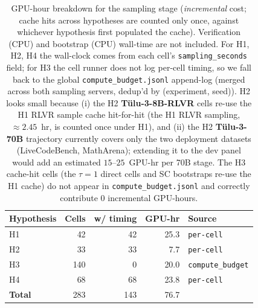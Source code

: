 \begin{table}[htbp]
\centering
\small
\caption{GPU-hour breakdown for the sampling stage (\emph{incremental} cost; cache hits across hypotheses are counted only once, against whichever hypothesis first populated the cache). Verification (CPU) and bootstrap (CPU) wall-time are not included. For H1, H2, H4 the wall-clock comes from each cell's \texttt{sampling\_seconds} field; for H3 the cell runner does not log per-cell timing, so we fall back to the global \texttt{compute\_budget.jsonl} append-log (merged across both sampling servers, dedup'd by (experiment, seed)). H2 looks small because (i) the H2 \textbf{Tülu-3-8B-RLVR} cells re-use the H1 RLVR sample cache hit-for-hit (the H1 RLVR sampling, $\approx 2.45$~hr, is counted once under H1), and (ii) the H2 \textbf{Tülu-3-70B} trajectory currently covers only the two deployment datasets (LiveCodeBench, MathArena); extending it to the dev panel would add an estimated $15\text{--}25$~GPU-hr per 70B stage. The H3 cache-hit cells (the $\tau{=}1$ direct cells and SC bootstraps re-use the H1 cache) do not appear in \texttt{compute\_budget.jsonl} and correctly contribute $0$ incremental GPU-hours.}
\label{tab:appendix_gpu_hours}
\begin{tabular}{lrrrl}
\toprule
Hypothesis & Cells & w/ timing & GPU-hr & Source \\
\midrule
H1 & 42 & 42 & 25.3 & \texttt{per-cell} \\
H2 & 33 & 33 & 7.7 & \texttt{per-cell} \\
H3 & 140 & 0 & 20.0 & \texttt{compute\_budget} \\
H4 & 68 & 68 & 23.8 & \texttt{per-cell} \\
\midrule
\textbf{Total} & 283 & 143 & 76.7 & \\
\bottomrule
\end{tabular}
\end{table}